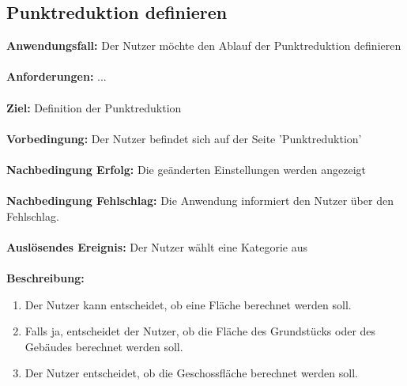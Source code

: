 \documentclass[parskip=full]{scrartcl} %
\begin{document}
\subsection*{Punktreduktion definieren}
\textbf{Anwendungsfall:} Der Nutzer möchte den Ablauf der Punktreduktion definieren\\\\
\textbf{Anforderungen:} ...\\\\
\textbf{Ziel:} Definition der Punktreduktion \\\\
\textbf{Vorbedingung:} Der Nutzer befindet sich auf der Seite 'Punktreduktion' \\\\
\textbf{Nachbedingung Erfolg:} Die geänderten Einstellungen werden angezeigt \\\\
\textbf{Nachbedingung Fehlschlag:} Die Anwendung informiert den Nutzer über den Fehlschlag. \\\\
\textbf{Auslösendes Ereignis:} Der Nutzer wählt eine Kategorie aus \\\\
\textbf{Beschreibung:}
\begin{enumerate}
    \item Der Nutzer kann entscheidet, ob eine Fläche berechnet werden soll.
    \item Falls ja, entscheidet der Nutzer, ob die Fläche des Grundstücks oder des Gebäudes berechnet werden soll.
    \item Der Nutzer entscheidet, ob die Geschossfläche berechnet werden soll.
\end{enumerate}
\newpage
\end{document}

